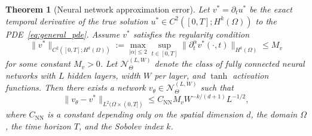 \documentclass[11pt,reqno]{amsart}
\theoremstyle{plain}
\newtheorem{theorem}{Theorem}[section]
\theoremstyle{definition}
\theoremstyle{remark}
\begin{document}
\begin{theorem}[Neural network approximation error]\label{thm:nn_approximation_error}
Let $v^* = \partial_t u^*$ be the exact temporal derivative of the true solution $u^* \in C^2([0,T]; H^k(\Omega))$ to the PDE~\eqref{eq:general_pde}. Assume $v^*$ satisfies the regularity condition 
\begin{equation}
    \|v^*\|_{C^2([0,T]; H^k(\Omega))} := \max_{|\alpha| \leq 2} \sup_{t \in [0,T]} \|\partial_t^\alpha v^*(\cdot,t)\|_{H^k(\Omega)} \leq M_v
\end{equation}
for some constant $M_v > 0$. Let $\mathcal{N}_{\Theta}^{(L,W)}$ denote the class of fully connected neural networks with $L$ hidden layers, width $W$ per layer, and $\tanh$ activation functions. Then there exists a network $v_\theta \in \mathcal{N}_{\Theta}^{(L,W)}$ such that
\begin{equation}\label{eq:nn_approx_bound}
    \|v_\theta - v^*\|_{L^2(\Omega \times (0,T])} \leq C_{\mathrm{NN}} M_v W^{-k/(d+1)} L^{-1/2},
\end{equation}
where $C_{\mathrm{NN}}$ is a constant depending only on the spatial dimension $d$, the domain $\Omega$, the time horizon $T$, and the Sobolev index $k$.
\end{theorem}
\end{document}
